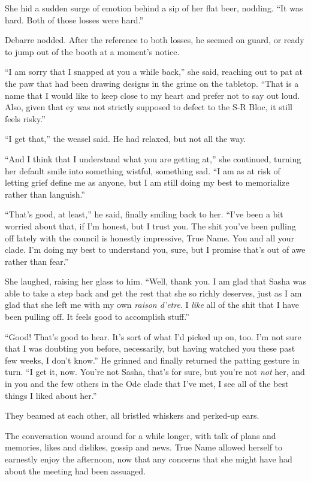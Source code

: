 She hid a sudden surge of emotion behind a sip of her flat beer, nodding. ``It was hard. Both of those losses were hard.''

Debarre nodded. After the reference to both losses, he seemed on guard, or ready to jump out of the booth at a moment's notice.

``I am sorry that I snapped at you a while back,'' she said, reaching out to pat at the paw that had been drawing designs in the grime on the tabletop. ``That is a name that I would like to keep close to my heart and prefer not to say out loud. Also, given that ey was not strictly supposed to defect to the S-R Bloc, it still feels risky.''

``I get that,'' the weasel said. He had relaxed, but not all the way.

``And I think that I understand what you are getting at,'' she continued, turning her default smile into something wistful, something sad. ``I am as at risk of letting grief define me as anyone, but I am still doing my best to memorialize rather than languish.''

``That's good, at least,'' he said, finally smiling back to her. ``I've been a bit worried about that, if I'm honest, but I trust you. The shit you've been pulling off lately with the council is honestly impressive, True Name. You and all your clade. I'm doing my best to understand you, sure, but I promise that's out of awe rather than fear.''

She laughed, raising her glass to him. ``Well, thank you. I am glad that Sasha was able to take a step back and get the rest that she so richly deserves, just as I am glad that she left me with my own \emph{raison d'etre}. I \emph{like} all of the shit that I have been pulling off. It feels good to accomplish stuff.''

``Good! That's good to hear. It's sort of what I'd picked up on, too. I'm not sure that I was doubting you before, necessarily, but having watched you these past few weeks, I don't know.'' He grinned and finally returned the patting gesture in turn. ``I get it, now. You're not Sasha, that's for sure, but you're not \emph{not} her, and in you and the few others in the Ode clade that I've met, I see all of the best things I liked about her.''

They beamed at each other, all bristled whiskers and perked-up ears.

The conversation wound around for a while longer, with talk of plans and memories, likes and dislikes, gossip and news. True Name allowed herself to earnestly enjoy the afternoon, now that any concerns that she might have had about the meeting had been assuaged.

